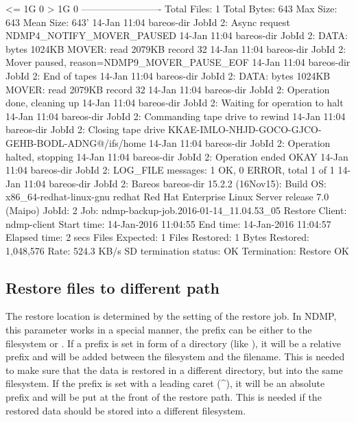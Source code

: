 \begin{bconsole}{}
        <= 1G                   0
         > 1G                   0
        -------------------------
        Total Files:            1
        Total Bytes:            643
        Max Size:               643
        Mean Size:              643'
14-Jan 11:04 bareos-dir JobId 2: Async request NDMP4_NOTIFY_MOVER_PAUSED
14-Jan 11:04 bareos-dir JobId 2: DATA: bytes 1024KB  MOVER: read 2079KB record 32
14-Jan 11:04 bareos-dir JobId 2: Mover paused, reason=NDMP9_MOVER_PAUSE_EOF
14-Jan 11:04 bareos-dir JobId 2: End of tapes
14-Jan 11:04 bareos-dir JobId 2: DATA: bytes 1024KB  MOVER: read 2079KB record 32
14-Jan 11:04 bareos-dir JobId 2: Operation done, cleaning up
14-Jan 11:04 bareos-dir JobId 2: Waiting for operation to halt
14-Jan 11:04 bareos-dir JobId 2: Commanding tape drive to rewind
14-Jan 11:04 bareos-dir JobId 2: Closing tape drive KKAE-IMLO-NHJD-GOCO-GJCO-GEHB-BODL-ADNG@/ifs/home
14-Jan 11:04 bareos-dir JobId 2: Operation halted, stopping
14-Jan 11:04 bareos-dir JobId 2: Operation ended OKAY
14-Jan 11:04 bareos-dir JobId 2: LOG_FILE messages: 1 OK, 0 ERROR, total 1 of 1
14-Jan 11:04 bareos-dir JobId 2: Bareos bareos-dir 15.2.2 (16Nov15):
  Build OS:               x86_64-redhat-linux-gnu redhat Red Hat Enterprise Linux Server release 7.0 (Maipo)
  JobId:                  2
  Job:                    ndmp-backup-job.2016-01-14_11.04.53_05
  Restore Client:         ndmp-client
  Start time:             14-Jan-2016 11:04:55
  End time:               14-Jan-2016 11:04:57
  Elapsed time:           2 secs
  Files Expected:         1
  Files Restored:         1
  Bytes Restored:         1,048,576
  Rate:                   524.3 KB/s
  SD termination status:  OK
  Termination:            Restore OK
\end{bconsole}

\subsection{Restore files to different path}
\label{sec:ndmp-where}

The restore location is determined by the  setting of the restore job.
In NDMP, this parameter works in a special manner, the prefix can be either  to the filesystem or .
If a prefix is set in form of a directory (like ), it will be a relative prefix and will be added between the filesystem and the filename. This is needed to make sure that the data is restored in a different directory, but  into the same filesystem.
If the prefix is set with a leading caret (\textasciicircum), it will be an absolute prefix and will be put at the front of the restore path. This is needed if the restored data should be stored into a different filesystem.

